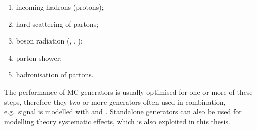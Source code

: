 \begin{enumerate}[label=\textbullet]
	\item incoming hadrons (protons);
	\item hard scattering of partons;
	\item boson radiation (\Z, \photon, \cPg);
	\item parton shower;
	\item hadronisation of partons.
\end{enumerate}

The performance of MC generators is usually optimised for one or more of these steps, therefore they two or more
generators often used in combination, e.g.\ \ttbar signal is modelled with \MADGRAPH and \PYTHIA. Standalone generators
can also be used for modelling theory systematic effects, which is also exploited in this thesis.

